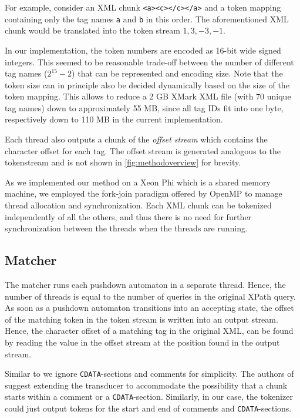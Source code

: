 For example, consider an XML chunk \verb;<a><c></c></a>; and a token mapping
containing only the tag names \verb;a; and \verb;b; in this order. The
aforementioned XML chunk would be translated into the token stream $1, 3, -3,
-1$.

In our implementation, the token numbers are encoded as 16-bit wide signed
integers. This seemed to be reasonable trade-off between the number of different
tag names ($2^{15}-2$) that can be represented and encoding size. Note that the
token size can in principle also be decided dynamically based on the size of the
token mapping. This allows to reduce a 2 GB XMark XML file (with 70 unique tag 
names) down to approximately 55 MB, since all tag IDs fit into one byte, respectively 
down to 110 MB in the current implementation.

Each thread also outputs a chunk of the \emph{offset stream} which contains the
character offset for each tag. The offset stream is generated analogous to the
tokenstream and is not shown in \ref{fig:methodoverview} for brevity.

As we implemented our method on a Xeon Phi which is a shared
memory machine, we employed the fork-join paradigm offered by OpenMP to manage
thread allocation and synchronization. Each XML chunk can be tokenized
independently of all the others, and thus there is no need for further
synchronization between the threads when the threads are running.

\subsection{Matcher}
The matcher runs each pushdown automaton in a separate thread. Hence, the
number of threads is equal to the number of queries in the original XPath
query. As soon as a pushdown automaton transitions into an accepting state,
the offset of the matching token in the token stream is written into an output
stream. Hence, the character offset of a matching tag in the original XML, can
be found by reading the value in the offset stream at the position found in the
output stream.

Similar to \cite{Ogden2013} we ignore \texttt{CDATA}-sections and comments for
simplicity. The authors of \cite{Ogden2013} suggest extending the transducer to
accommodate the possibility that a chunk starts within a comment or a
\texttt{CDATA}-section. Similarly, in our case, the tokenizer could just output
tokens for the start and end of comments and \texttt{CDATA}-sections.



